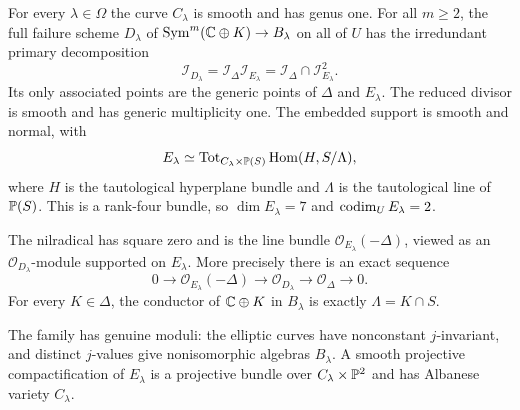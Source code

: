 \begin{theorem}
\label{thm:elliptic-boundary}
For every $\lambda\in\Omega$ the curve $C_\lambda$ is smooth and
has genus one. For all $m\ge2$, the full failure scheme $D_\lambda$
of $\operatorname{Sym}^m(\mathbb C\oplus K)\to B_\lambda$ on all of $U$ has the
irredundant primary decomposition
\begin{equation}\label{eq:elliptic-primary}
 \mathcal I_{D_\lambda}
     =\mathcal I_\Delta\mathcal I_{E_\lambda}
     =\mathcal I_\Delta\cap\mathcal I_{E_\lambda}^{2}.
\end{equation}
Its only associated points are the generic points of $\Delta$
and $E_\lambda$. The reduced divisor is smooth and has generic
multiplicity one. The embedded support is smooth and normal, with
\begin{equation}\label{eq:elliptic-bundle}
 E_\lambda\simeq
 \operatorname{Tot}_{C_\lambda\times\mathbb P(S)}
                    \operatorname{Hom}(H,S/\Lambda),
\end{equation}
where $H$ is the tautological hyperplane bundle and $\Lambda$
is the tautological line of $\mathbb P(S)$. This is a rank-four bundle,
so $\dim E_\lambda=7$ and $\operatorname{codim}_U E_\lambda=2$.

The nilradical has square zero and is the line bundle
$\mathcal O_{E_\lambda}(-\Delta)$, viewed as an
$\mathcal O_{D_\lambda}$-module supported on $E_\lambda$.
More precisely there is an exact sequence
\begin{equation}\label{eq:elliptic-nilradical}
 0\longrightarrow\mathcal O_{E_\lambda}(-\Delta)
 \longrightarrow\mathcal O_{D_\lambda}
 \longrightarrow\mathcal O_\Delta\longrightarrow0.
\end{equation}
For every $K\in\Delta$, the conductor of $\mathbb C\oplus K$ in
$B_\lambda$ is exactly $\Lambda=K\cap S$.

The family has genuine moduli: the elliptic curves have nonconstant
$j$-invariant, and distinct $j$-values give nonisomorphic algebras
$B_\lambda$. A smooth projective compactification of $E_\lambda$
is a projective bundle over $C_\lambda\times\mathbb P^2$ and has
Albanese variety $C_\lambda$.
\end{theorem}
